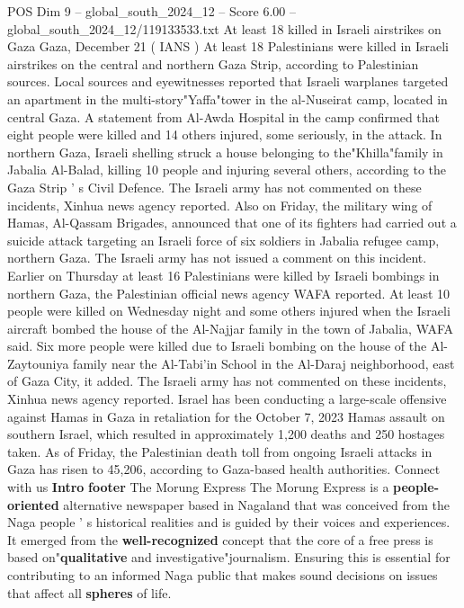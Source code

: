 \begin{textsample}{POS Dim 9 – global\_south\_2024\_12 – Score 6.00 – global\_south\_2024\_12/119133533.txt}  \label{ex:f9_pos_324}
At least 18 killed in Israeli airstrikes on Gaza Gaza, December 21 ( IANS ) At least 18 Palestinians were killed in Israeli airstrikes on the central and northern Gaza Strip, according to Palestinian sources.
Local sources and eyewitnesses reported that Israeli warplanes targeted an apartment in the multi-story"Yaffa"tower in the al-Nuseirat camp, located in central Gaza.
A statement from Al-Awda Hospital in the camp confirmed that eight people were killed and 14 others injured, some seriously, in the attack.
In northern Gaza, Israeli shelling struck a house belonging to the"Khilla"family in Jabalia Al-Balad, killing 10 people and injuring several others, according to the Gaza Strip ' s Civil Defence.
The Israeli army has not commented on these incidents, Xinhua news agency reported.
Also on Friday, the military wing of Hamas, Al-Qassam Brigades, announced that one of its fighters had carried out a suicide attack targeting an Israeli force of six soldiers in Jabalia refugee camp, northern Gaza.
The Israeli army has not issued a comment on this incident.
Earlier on Thursday at least 16 Palestinians were killed by Israeli bombings in northern Gaza, the Palestinian official news agency WAFA reported.
At least 10 people were killed on Wednesday night and some others injured when the Israeli aircraft bombed the house of the Al-Najjar family in the town of Jabalia, WAFA said.
Six more people were killed due to Israeli bombing on the house of the Al-Zaytouniya family near the Al-Tabi'in School in the Al-Daraj neighborhood, east of Gaza City, it added.
The Israeli army has not commented on these incidents, Xinhua news agency reported.
Israel has been conducting a large-scale offensive against Hamas in Gaza in retaliation for the October 7, 2023 Hamas assault on southern Israel, which resulted in approximately 1,200 deaths and 250 hostages taken.
As of Friday, the Palestinian death toll from ongoing Israeli attacks in Gaza has risen to 45,206, according to Gaza-based health authorities.
Connect with us \textbf{Intro} \textbf{footer} The Morung Express The Morung Express is a \textbf{people-oriented} alternative newspaper based in Nagaland that was conceived from the Naga people ' s historical realities and is guided by their voices and experiences.
It emerged from the \textbf{well-recognized} concept that the core of a free press is based on"\textbf{qualitative} and investigative"journalism.
Ensuring this is essential for contributing to an informed Naga public that makes sound decisions on issues that affect all \textbf{spheres} of life.

\end{textsample}
